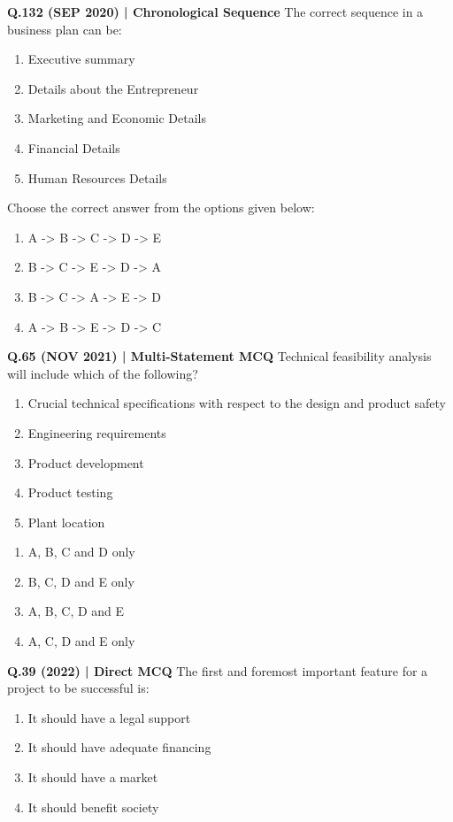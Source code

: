\documentclass{article}
\begin{document}
\textbf{Q.132 (SEP 2020) | Chronological Sequence}
The correct sequence in a business plan can be:
\begin{enumerate}[label=\Alph*.]
    \item Executive summary
    \item Details about the Entrepreneur
    \item Marketing and Economic Details
    \item Financial Details
    \item Human Resources Details
\end{enumerate}
Choose the correct answer from the options given below:
\begin{enumerate}[label=(\arabic*)]
    \item A -> B -> C -> D -> E
    \item B -> C -> E -> D -> A
    \item B -> C -> A -> E -> D
    \item A -> B -> E -> D -> C
\end{enumerate}

\textbf{Q.65 (NOV 2021) | Multi-Statement MCQ}
Technical feasibility analysis will include which of the following?
\begin{enumerate}[label=\Alph*.]
    \item Crucial technical specifications with respect to the design and product safety
    \item Engineering requirements
    \item Product development
    \item Product testing
    \item Plant location
\end{enumerate}
\begin{enumerate}[label=(\arabic*)]
    \item A, B, C and D only
    \item B, C, D and E only
    \item A, B, C, D and E
    \item A, C, D and E only
\end{enumerate}

\textbf{Q.39 (2022) | Direct MCQ}
The first and foremost important feature for a project to be successful is:
\begin{enumerate}[label=(\arabic*)]
    \item It should have a legal support
    \item It should have adequate financing
    \item It should have a market
    \item It should benefit society
\end{enumerate}
\end{document}
